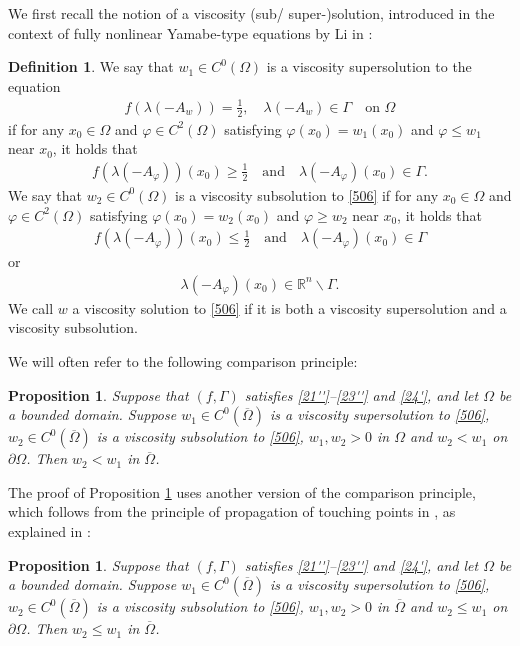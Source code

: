 \documentclass[12pt]{article}
\numberwithin{equation}{section}
\theoremstyle{plain}
\newtheorem{prop}[thm]{Proposition}
\theoremstyle{definition}
\newtheorem{defn}[thm]{Definition}
\renewcommand{\phi}{\varphi}
\begin{document}
We first recall the notion of a viscosity (sub/ super-)solution, introduced in the context of fully nonlinear Yamabe-type equations by Li in \cite{Li09}:
\begin{defn}\label{137}
	We say that $w_1 \in C^0(\Omega)$ is a viscosity supersolution to the equation 
	\begin{align}\label{506}
	f(\lambda(-A_w)) = \frac{1}{2}, \quad \lambda(-A_w)\in\Gamma \quad \text{on }\Omega
	\end{align}
	if for any $x_0\in\Omega$ and $\phi\in C^2(\Omega)$ satisfying $\phi(x_0) = w_1(x_0)$ and $\phi \leq w_1$ near $x_0$, it holds that 
	\begin{align*}
	f(\lambda(-A_\phi))(x_0) \geq \frac{1}{2} \quad \text{and} \quad  \lambda(-A_\phi)(x_0)\in\Gamma.  
	\end{align*} 
	We say that $w_2\in C^0(\Omega)$ is a viscosity subsolution to \eqref{506} if for any $x_0\in\Omega$ and $\phi\in C^2(\Omega)$ satisfying $\phi(x_0) = w_2(x_0)$ and $\phi \geq w_2$ near $x_0$, it holds that 
	\begin{align*}
	f(\lambda(-A_\phi))(x_0) \leq \frac{1}{2} \quad\text{and}\quad \lambda(-A_\phi)(x_0)\in\Gamma  
	\end{align*}
	or
	\begin{align*}
	\lambda(-A_\phi)(x_0)\in\mathbb{R}^n\backslash\Gamma. 
	\end{align*}
	We call $w$ a viscosity solution to \eqref{506} if it is both a viscosity supersolution and a viscosity subsolution. 
\end{defn}


We will often refer to the following comparison principle:
\begin{prop}\label{800}
	Suppose that $(f,\Gamma)$ satisfies \eqref{21''}--\eqref{23''} and \eqref{24'}, and let $\Omega$ be a bounded domain. Suppose $w_1 \in C^0(\overline{\Omega})$ is a viscosity supersolution to \eqref{506}, $w_2 \in C^0(\overline{\Omega})$ is a viscosity subsolution to \eqref{506}, $w_1,w_2>0$ in $\Omega$ and $w_2 < w_1$ on $\partial\Omega$. Then $w_2 < w_1$ in $\overline{\Omega}$. 
\end{prop}

The proof of Proposition \ref{800} uses another version of the comparison principle, which follows from the principle of propagation of touching points in \cite[Theorem 3.2]{LNW18}, as explained in \cite[Proposition 2.2]{GLN18}: 

\begin{prop}\label{510}
	Suppose that $(f,\Gamma)$ satisfies \eqref{21''}--\eqref{23''} and \eqref{24'}, and let $\Omega$ be a bounded domain. Suppose $w_1 \in C^0(\overline{\Omega})$ is a viscosity supersolution to \eqref{506}, $w_2 \in C^0(\overline{\Omega})$ is a viscosity subsolution to \eqref{506}, $w_1,w_2>0$ in $\overline{\Omega}$ and $w_2 \leq w_1$ on $\partial\Omega$. Then $w_2 \leq w_1$ in $\overline{\Omega}$. 
\end{prop}
\end{document}
